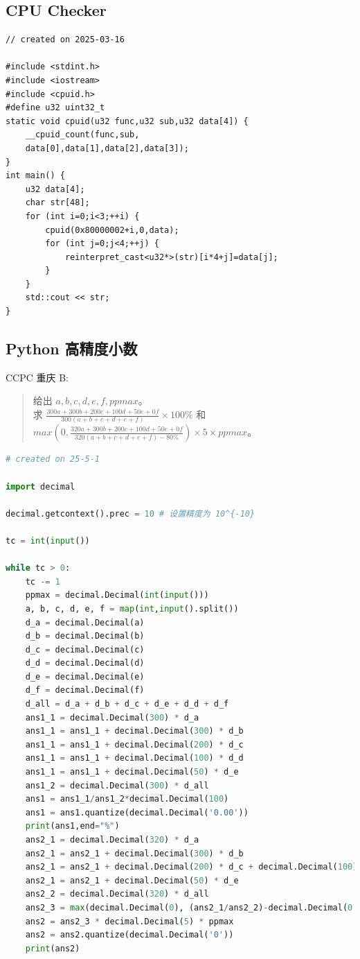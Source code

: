 \documentclass[a4paper,12pt]{article}
\begin{document}
\subsection{CPU Checker}

\begin{lstlisting}
// created on 2025-03-16

#include <stdint.h>
#include <iostream>
#include <cpuid.h>
#define u32 uint32_t
static void cpuid(u32 func,u32 sub,u32 data[4]) {
    __cpuid_count(func,sub,
    data[0],data[1],data[2],data[3]);
}
int main() {
    u32 data[4];
    char str[48];
    for (int i=0;i<3;++i) {
        cpuid(0x80000002+i,0,data);
        for (int j=0;j<4;++j) { 
            reinterpret_cast<u32*>(str)[i*4+j]=data[j];
        }    
    }
    std::cout << str;
}
\end{lstlisting}

\subsection{Python 高精度小数}

 CCPC 重庆 B:

\begin{quote}
    给出 \(a,b,c,d,e,f,ppmax\)。\\

    求 \(\frac{300 a + 300 b + 200 c + 100 d + 50 e + 0 f}{300(a + b + c + d + e + f)} \times 100 \%\)
    和 \(max(0,\frac{320 a + 300 b + 200 c + 100 d + 50 e + 0f}{320(a + b + c + d + e + f) - 80 \% }) \times 5 \times ppmax\)。
\end{quote}

\begin{lstlisting}[language=Python]
# created on 25-5-1

import decimal

decimal.getcontext().prec = 10 # 设置精度为 10^{-10}

tc = int(input())

while tc > 0:
    tc -= 1
    ppmax = decimal.Decimal(int(input()))
    a, b, c, d, e, f = map(int,input().split())
    d_a = decimal.Decimal(a)
    d_b = decimal.Decimal(b)
    d_c = decimal.Decimal(c)
    d_d = decimal.Decimal(d)
    d_e = decimal.Decimal(e)
    d_f = decimal.Decimal(f)
    d_all = d_a + d_b + d_c + d_e + d_d + d_f
    ans1_1 = decimal.Decimal(300) * d_a 
    ans1_1 = ans1_1 + decimal.Decimal(300) * d_b 
    ans1_1 = ans1_1 + decimal.Decimal(200) * d_c 
    ans1_1 = ans1_1 + decimal.Decimal(100) * d_d 
    ans1_1 = ans1_1 + decimal.Decimal(50) * d_e
    ans1_2 = decimal.Decimal(300) * d_all
    ans1 = ans1_1/ans1_2*decimal.Decimal(100)
    ans1 = ans1.quantize(decimal.Decimal('0.00'))
    print(ans1,end="%")
    ans2_1 = decimal.Decimal(320) * d_a 
    ans2_1 = ans2_1 + decimal.Decimal(300) * d_b 
    ans2_1 = ans2_1 + decimal.Decimal(200) * d_c + decimal.Decimal(100) * d_d 
    ans2_1 = ans2_1 + decimal.Decimal(50) * d_e
    ans2_2 = decimal.Decimal(320) * d_all
    ans2_3 = max(decimal.Decimal(0), (ans2_1/ans2_2)-decimal.Decimal(0.8))
    ans2 = ans2_3 * decimal.Decimal(5) * ppmax
    ans2 = ans2.quantize(decimal.Decimal('0'))
    print(ans2)
\end{lstlisting}
\end{document}
